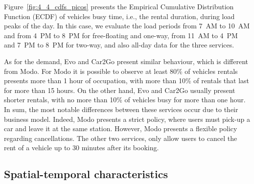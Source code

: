Figure~\ref{fig:4_4_cdfs_picos} presents the Empirical Cumulative Distribution Function (ECDF) of vehicles busy time, i.e., the rental duration, during load peaks of the day. In this case, we evaluate the load periods from 7~AM to 10~AM and from 4~PM to 8~PM for free-floating and one-way, from 11~AM to 4~PM and 7~PM to 8~PM for two-way, and also all-day data for the three services. 

As for the demand, Evo and Car2Go present similar behaviour, which is different from Modo. For Modo it is possible to observe at least 80\% of vehicles rentals presents more than 1 hour of occupation, with more than 10\% of rentals that last for more than 15 hours. On the other hand, Evo and Car2Go usually present shorter rentals, with no more than 10\% of vehicles busy for more than one hour. 
In sum, the most notable differences between these services occur due to their business model. Indeed, Modo presents a strict policy, where users must pick-up a car and leave it at the same station. However, Modo presents a flexible policy regarding cancellations. The other two services, only allow users to cancel the rent of a vehicle up to 30 minutes after its booking.


\subsection{Spatial-temporal characteristics}
\label{sec:4_4_spatial-temporal}


